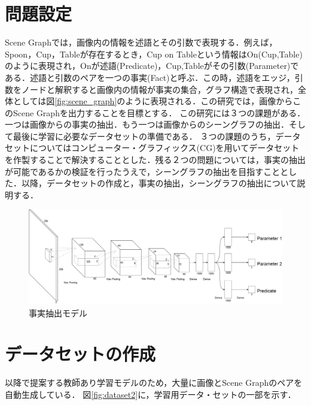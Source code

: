 \section{問題設定}
Scene Graphでは，画像内の情報を述語とその引数で表現する．例えば，Spoon，Cup，Tableが存在するとき，Cup on Tableという情報はOn(Cup,Table)のように表現され，Onが述語(Predicate)，Cup,Tableがその引数(Parameter)である．述語と引数のペアを一つの事実(Fact)と呼ぶ．この時，述語をエッジ，引数をノードと解釈すると画像内の情報が事実の集合，グラフ構造で表現され，全体としては図\ref{fig:scene_graph}のように表現される．この研究では，画像からこのScene Graphを出力することを目標とする．
この研究には３つの課題がある．一つは画像からの事実の抽出．もう一つは画像からのシーングラフの抽出．そして最後に学習に必要なデータセットの準備である．
３つの課題のうち，データセットについてはコンピューター・グラフィックス(CG)を用いてデータセットを作製することで解決することとした．残る２つの問題については，事実の抽出が可能であるかの検証を行ったうえで，シーングラフの抽出を目指すこととした．以降，データセットの作成と，事実の抽出，シーングラフの抽出について説明する．


\begin{figure}
\begin{center}
    \includegraphics[scale=0.1]{./Figures/model1}
    \caption{事実抽出モデル}
    \label{fig:model1}
\end{center}
\end{figure}
\section{データセットの作成}
以降で提案する教師あり学習モデルのため，大量に画像とScene Graphのペアを自動生成している．
図\ref{fig:dataset2}に，学習用データ・セットの一部を示す．

